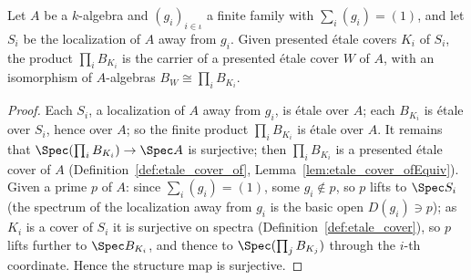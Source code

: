 \begin{theorem}
  \label{thm:PicEtAff_exists_etaleCover_pi}
  \leanok
  Let \(A\) be a \(k\)-algebra and \((g_i)_{i \in \iota}\) a finite family with
  \(\sum_i (g_i) = (1)\), and let \(S_i\) be the localization of \(A\) away from \(g_i\). Given
  presented \'etale covers \(K_i\) of \(S_i\), the product \(\prod_i B_{K_i}\) is the carrier of a
  presented \'etale cover \(W\) of \(A\), with an isomorphism of \(A\)-algebras \(B_W \cong
  \prod_i B_{K_i}\).
\end{theorem}
\begin{proof}
  \leanok
  Each \(S_i\), a localization of \(A\) away from \(g_i\), is \'etale over \(A\); each \(B_{K_i}\)
  is \'etale over \(S_i\), hence over \(A\); so the finite product \(\prod_i B_{K_i}\) is \'etale
  over \(A\). It remains that \(\Spec(\prod_i B_{K_i}) \to \Spec A\) is surjective; then
  \(\prod_i B_{K_i}\) is a presented \'etale cover of \(A\) (Definition~\ref{def:etale_cover_of},
  Lemma~\ref{lem:etale_cover_ofEquiv}). Given a prime \(p\) of \(A\): since
  \(\sum_i (g_i) = (1)\), some \(g_i \notin p\), so \(p\) lifts to \(\Spec S_i\) (the spectrum of
  the localization away from \(g_i\) is the basic open \(D(g_i) \ni p\)); as \(K_i\) is a cover of
  \(S_i\) it is surjective on spectra (Definition~\ref{def:etale_cover}), so \(p\) lifts further to
  \(\Spec B_{K_i}\), and thence to \(\Spec(\prod_j B_{K_j})\) through the \(i\)-th coordinate. Hence
  the structure map is surjective.
\end{proof}

